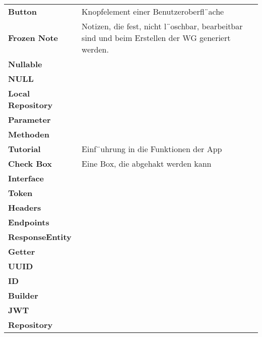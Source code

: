 \begin{table}[h!]
\begin{tabular}{p{4cm}p{10cm}}
				\textbf{Button} & Knopfelement einer Benutzeroberﬂ¨ache
  \\
				\textbf{Frozen Note} & Notizen, die fest, nicht l¨oschbar, bearbeitbar sind und beim Erstellen der WG generiert werden.
   \\
				\textbf{Nullable} &   \\
				\textbf{NULL} &   \\
				\textbf{Local Repository} &   \\
				\textbf{Parameter} &   \\
				\textbf{Methoden} &   \\
				\textbf{Tutorial} &  Einf¨uhrung in die Funktionen der App
   \\
				\textbf{Check Box} &  Eine Box, die abgehakt werden kann \\
				\textbf{Interface} &   \\
				\textbf{Token} &   \\
				\textbf{Headers} &   \\
				\textbf{Endpoints} &   \\
				\textbf{ResponseEntity} &   \\	
				\textbf{Getter} &   \\	
				\textbf{UUID} &   \\	
				\textbf{ID} &   \\	
				\textbf{Builder} &   \\	
				\textbf{JWT} &   \\	
				\textbf{Repository} &   \\	
				
			\end{tabular}
		\end{table}
	
		

